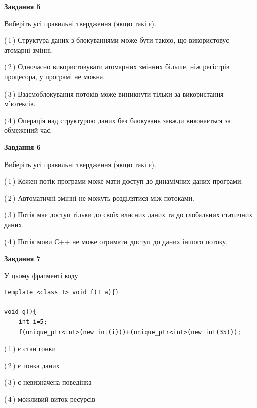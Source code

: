 \documentclass[12pt, ukrainian]{article}
\begin{document}
\begin {large}
{\begin{center}
\textbf{Завдання 5}
\end{center}

Виберіть усі правильні твердження (якщо такі є).\par
\vspace{2mm}

(\,1\,) Структура даних з блокуваннями може бути такою, що використовує атомарні змінні.%

(\,2\,) Одночасно використовувати атомарних змінних більше, ніж регістрів процесора, у програмі не можна.%

(\,3\,) Взаємоблокування потоків може виникнути тільки за використання м’ютексів.%

(\,4\,) Операція над структурою даних без блокувань завжди виконається за обмежений час.%
\newpage


\begin{center}
\textbf{Завдання 6}
\end{center}

Виберіть усі правильні твердження (якщо такі є).\par
\vspace{2mm}

(\,1\,) Кожен потік програми може мати доступ до динамічних даних програми.%

(\,2\,) Автоматичні змінні не можуть розділятися між потоками.%

(\,3\,) Потік має доступ тільки до своїх власних даних та до глобальних статичних даних.%

(\,4\,) Потік мови С++ не може отримати доступ до даних іншого потоку.%


\begin{center}
\textbf{Завдання 7}
\end{center}

У цьому фрагменті коду
\begin{verbatim}
template <class T> void f(T a){}

void g(){
    int i=5;
    f(unique_ptr<int>(new int(i)))+(unique_ptr<int>(new int(35)));
\end{verbatim}
(\,1\,) є стан гонки%

(\,2\,) є гонка даних%

(\,3\,) є невизначена поведінка%

(\,4\,) можливий виток ресурсів%

}
\end {large}

\vspace{4mm}
\newpage
\end{document}
